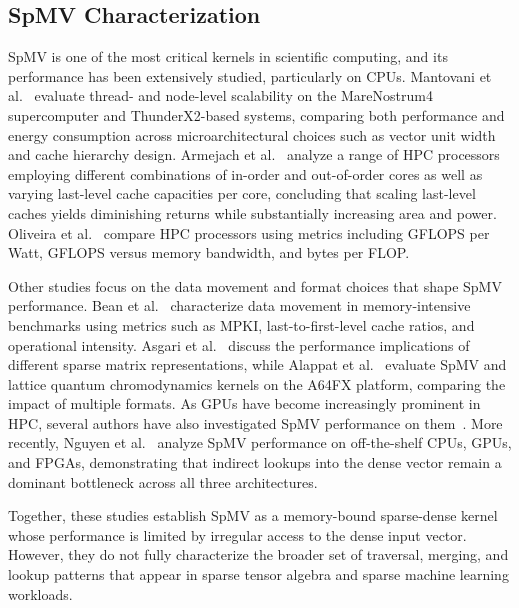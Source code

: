 \subsection{SpMV Characterization} \label{sec:related-work-spmv-characterization}
SpMV is one of the most critical kernels in scientific computing, and its performance has been extensively studied, particularly on CPUs. Mantovani et al.~\cite{mantovani2020performance} evaluate thread- and node-level scalability on the MareNostrum4 supercomputer and ThunderX2-based systems, comparing both performance and energy consumption across microarchitectural choices such as vector unit width and cache hierarchy design. Armejach et al.~\cite{armejach2019design} analyze a range of HPC processors employing different combinations of in-order and out-of-order cores as well as varying last-level cache capacities per core, concluding that scaling last-level caches yields diminishing returns while substantially increasing area and power. Oliveira et al.~\cite{oliveira2021damov} compare HPC processors using metrics including GFLOPS per Watt, GFLOPS versus memory bandwidth, and bytes per FLOP.

Other studies focus on the data movement and format choices that shape SpMV performance. Bean et al.~\cite{bean2015dma} characterize data movement in memory-intensive benchmarks using metrics such as MPKI, last-to-first-level cache ratios, and operational intensity. Asgari et al.~\cite{asgari2021iiswc} discuss the performance implications of different sparse matrix representations, while Alappat et al.~\cite{alappat2022ccpe} evaluate SpMV and lattice quantum chromodynamics kernels on the A64FX platform, comparing the impact of multiple formats. As GPUs have become increasingly prominent in HPC, several authors have also investigated SpMV performance on them~\cite{bell2009implementing}. More recently, Nguyen et al.~\cite{nguyen2022ccpe} analyze SpMV performance on off-the-shelf CPUs, GPUs, and FPGAs, demonstrating that indirect lookups into the dense vector remain a dominant bottleneck across all three architectures.

Together, these studies establish SpMV as a memory-bound sparse-dense kernel whose performance is limited by irregular access to the dense input vector. However, they do not fully characterize the broader set of traversal, merging, and lookup patterns that appear in sparse tensor algebra and sparse machine learning workloads.

